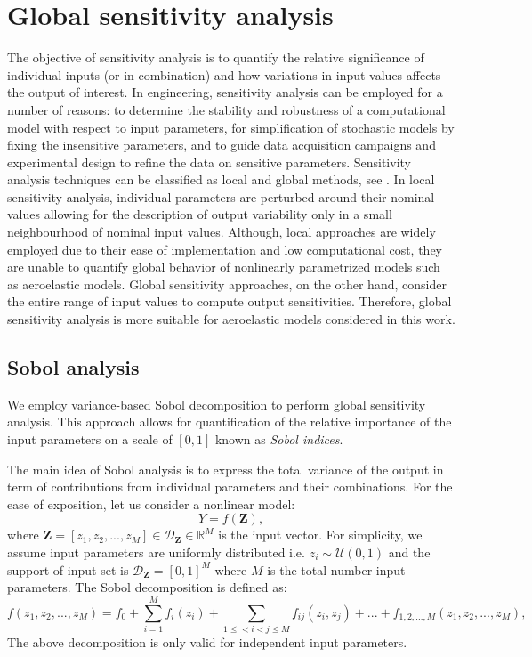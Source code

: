 \documentclass[review]{elsarticle}
\numberwithin{equation}{section}
\numberwithin{equation}{section}
\begin{document}
\section{Global sensitivity analysis}
The objective of sensitivity analysis is to quantify the relative significance of individual inputs (or in combination) and how variations in input values affects the output of interest. In engineering, sensitivity analysis can be employed for a number of reasons: to determine the stability and robustness of a computational model with respect to input parameters, for simplification of stochastic models by fixing the insensitive parameters, and to guide data acquisition campaigns and experimental design to refine the data on sensitive parameters. Sensitivity analysis techniques can be classified as local and global methods, see \cite{RSmith}. In local sensitivity analysis, individual parameters are perturbed around their nominal values allowing for the description of output variability only in a small neighbourhood of nominal input values. Although, local approaches are widely employed due to their ease of implementation and low computational cost, they are unable to quantify global behavior of nonlinearly parametrized models such as aeroelastic models. Global sensitivity approaches, on the other hand, consider the entire range of input values to compute output sensitivities. Therefore, global sensitivity analysis is more suitable for aeroelastic models considered in this work.  

\subsection{Sobol analysis}
We employ variance-based Sobol decomposition to perform global sensitivity analysis. This approach allows for quantification of  the relative importance of the input parameters on a scale of $[0,1]$ known as \emph{Sobol indices}. 

The main idea of Sobol analysis is to express the total variance of the output in term of contributions from individual parameters and their combinations. For the ease of exposition, let us consider a nonlinear model:
\begin{equation}\label{nonlinear_model}
Y = f(\mathbf{Z}),
\end{equation}
where $\mathbf{Z} = [z_1, z_2, ..., z_M]\in \mathcal{D}_{\mathbf{Z}}\in \mathbb{R}^M$ is the input vector. For simplicity, we assume input parameters are uniformly distributed i.e. $z_i \sim \mathcal{U}(0,1)$ and the support of input set is $\mathcal{D}_\mathbf{Z}  =  [0,1]^M$ where $M$ is the total number input parameters. The Sobol decomposition is defined as:
\begin{equation}\label{sobol_decomp}
f(z_1, z_2, ..., z_M) = f_0+\sum_{i=1}^M f_i(z_i) + \sum_{1\leq<i<j\leq M} f_{ij}(z_i,z_j) + ... + f_{1, 2, ..., M}(z_1, z_2, ..., z_M),
\end{equation}
The above decomposition is only valid for independent input parameters. 
\end{document}

